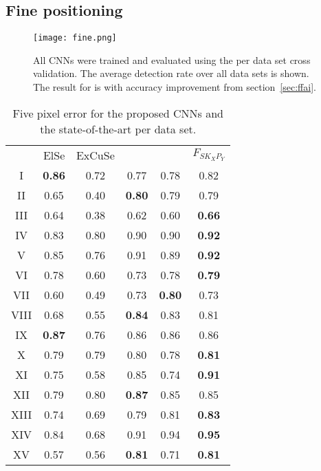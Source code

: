 \subsection{Fine positioning}
\begin{figure}[h]
	\begin{center}
		\texttt{[image: fine.png]}
	\end{center}
	\caption{
		All CNNs were trained and evaluated using the per data set cross validation. The average detection rate over all data sets is shown. The result for \csin{} is with accuracy improvement from section~\ref{sec:ffai}.
	}
	\label{fig:evalfine}
\end{figure}

\setlength{\tabcolsep}{0.2mm}
\renewcommand{\arraystretch}{0.5}
\begin{table}[h!]
	\caption{Five pixel error for the proposed CNNs and the state-of-the-art per data set.}
	\begin{center}
		\begin{tabular}{c|c|c|c|c|c|}
			& ElSe & ExCuSe & \csin{} & \cfin & $F_{SK_{X}P_{Y}}$  \\
			I & \textbf{0.86} & 0.72 & 0.77 & 0.78 & 0.82 \\
			II & 0.65 & 0.40 & \textbf{0.80} & 0.79 & 0.79 \\
			III & 0.64 & 0.38 & 0.62 & 0.60 & \textbf{0.66} \\
			IV & 0.83 & 0.80 & 0.90 & 0.90 & \textbf{0.92} \\
			V & 0.85 & 0.76 & 0.91 & 0.89 & \textbf{0.92} \\
			VI & 0.78 & 0.60 & 0.73 & 0.78 & \textbf{0.79} \\
			VII & 0.60 & 0.49 & 0.73 & \textbf{0.80} & 0.73 \\
			VIII & 0.68 & 0.55 & \textbf{0.84} & 0.83 & 0.81 \\
			IX & \textbf{0.87} & 0.76 & 0.86 & 0.86 & 0.86 \\
			X & 0.79 & 0.79 & 0.80 & 0.78 & \textbf{0.81} \\
			XI & 0.75 & 0.58 & 0.85 & 0.74 & \textbf{0.91} \\
			XII & 0.79 & 0.80 & \textbf{0.87} & 0.85 & 0.85 \\
			XIII & 0.74 & 0.69 & 0.79 & 0.81 & \textbf{0.83} \\
			XIV & 0.84 & 0.68 & 0.91 & 0.94 & \textbf{0.95} \\
			XV & 0.57 & 0.56 & \textbf{0.81} & 0.71 & \textbf{0.81} \\

\end{tabular}
\end{center}
\end{table}
